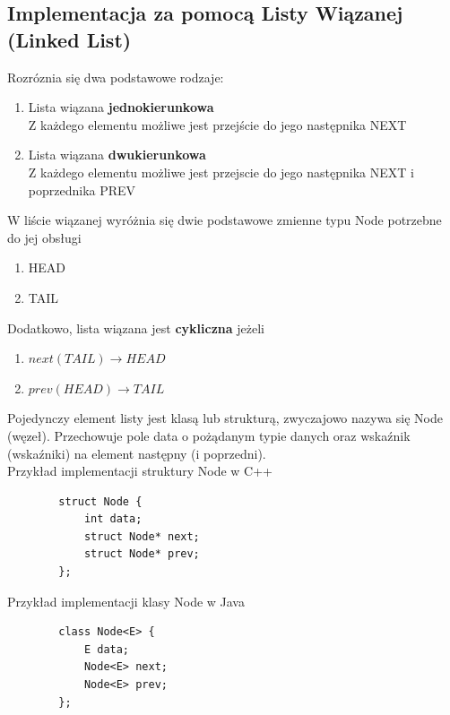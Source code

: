\documentclass[12pt]{article}
\begin{document}
        \subsection{Implementacja za pomocą Listy Wiązanej (Linked List)}
        Rozróznia się dwa podstawowe rodzaje:
        \begin{enumerate}
            \item Lista wiązana \textbf{jednokierunkowa} \\
            Z każdego elementu możliwe jest przejście do jego następnika NEXT
            \item Lista wiązana \textbf{dwukierunkowa} \\
            Z każdego elementu możliwe jest przejscie do jego następnika NEXT i poprzednika PREV
        \end{enumerate}

        W liście wiązanej wyróżnia się dwie podstawowe zmienne typu Node potrzebne do jej obsługi

        \begin{enumerate}
            \item HEAD
            \item TAIL
        \end{enumerate}

        Dodatkowo, lista wiązana jest \textbf{cykliczna} jeżeli

        \begin{enumerate}
            \item{$next(TAIL) \rightarrow HEAD$}
            \item{$prev(HEAD) \rightarrow TAIL$}
        \end{enumerate}

        Pojedynczy element listy jest klasą lub strukturą, zwyczajowo nazywa się Node (węzeł). Przechowuje pole data o pożądanym typie danych oraz wskaźnik (wskaźniki) na element następny (i poprzedni).
        \\
        Przykład implementacji struktury Node w C++

        \begin{verbatim}
        struct Node {
            int data;
            struct Node* next;
            struct Node* prev;
        };
        \end{verbatim}
        \newpage
        Przykład implementacji klasy Node w Java

        \begin{verbatim}
        class Node<E> {
            E data;
            Node<E> next;
            Node<E> prev;
        };
        \end{verbatim}
\end{document}
